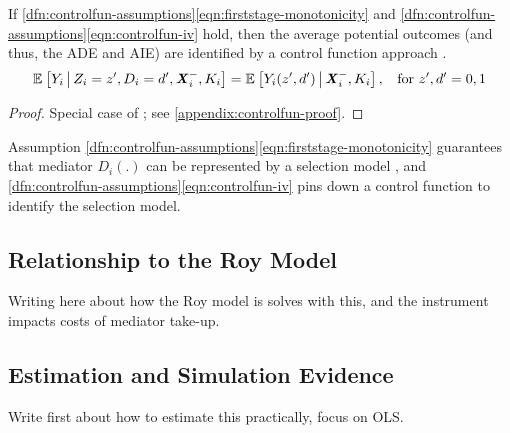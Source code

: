 \begin{theorem}
    \label{thm:controlfun}
    If \ref{dfn:controlfun-assumptions}\eqref{eqn:firststage-monotonicity} and \ref{dfn:controlfun-assumptions}\eqref{eqn:controlfun-iv} hold, then the average potential outcomes (and thus, the ADE and AIE) are identified by a control function approach .
    \[ \mathbb{E}_{} \left[ Y_i \, \middle\vert \, Z_i = z', D_i = d', \boldsymbol{\mathit{X}}_i^-, K_i \right]
        = \mathbb{E}_{} \left[ Y_i(z', d') \, \middle\vert \, \boldsymbol{\mathit{X}}_i^-, K_i \right]
        , \;\; \text{ for } z', d' = 0,1 \]
\end{theorem}
\begin{proof}
    Special case of \citet[Theorem~1]{imbens2009identification}; see \autoref{appendix:controlfun-proof}.
\end{proof}

Assumption \ref{dfn:controlfun-assumptions}\eqref{eqn:firststage-monotonicity} guarantees that mediator $D_i(.)$ can be represented by a selection model \citep{vytlacil2002independence}, and \ref{dfn:controlfun-assumptions}\eqref{eqn:controlfun-iv} pins down a control function to identify the selection model.

\subsection{Relationship to the Roy Model}

Writing here about how the Roy model is solves with this, and the instrument impacts costs of mediator take-up.

\subsection{Estimation and Simulation Evidence}

Write first about how to estimate this practically, focus on OLS.

